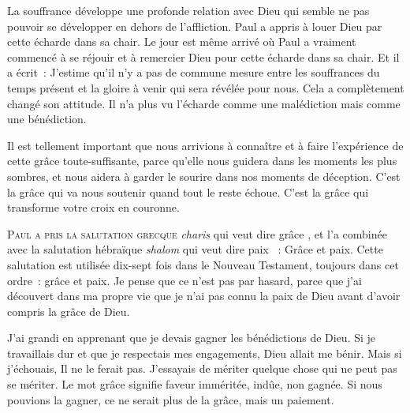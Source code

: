 
La souffrance développe une profonde relation avec Dieu qui semble
 ne pas pouvoir se développer en dehors de l'affliction.
 Paul a appris à louer Dieu par cette écharde dans sa chair.
 Le jour est même arrivé où Paul a vraiment commencé à se réjouir
 et à remercier Dieu pour cette écharde dans sa chair.
 Et il a écrit~: 
 \og J'estime qu'il n'y a pas de commune mesure entre les souffrances
 du temps présent et la gloire à venir qui sera révélée pour nous. \fg{}
 Cela a complètement changé son attitude. Il n'a plus vu l'écharde
 comme une malédiction mais comme une bénédiction.

Il est tellement important que nous arrivions à connaître
 et à faire l'expérience de cette grâce toute-suffisante,
 parce qu'elle nous guidera dans les moments les plus sombres,
 et nous aidera à garder le sourire dans nos moments de déception.
 C'est la grâce qui va nous soutenir quand tout le reste échoue.
 C'est la grâce qui transforme votre croix en couronne.

\dvrule






\lettrine{P}{aul a pris la salutation grecque} \emph{charis}
 qui veut dire \og grâce \fg{}, et l'a combinée avec la salutation
 hébraïque \emph{shalom} qui veut dire \og paix \fg{}~: 
 \og Grâce et paix. \fg{}
 Cette salutation est utilisée dix-sept fois dans le Nouveau Testament,
 toujours dans cet ordre~:  \og grâce et paix. \fg{}
 Je pense que ce n'est pas par hasard, parce que j'ai découvert
 dans ma propre vie que je n'ai pas connu la paix de Dieu
 avant d'avoir compris la grâce de Dieu.

J'ai grandi en apprenant que je devais gagner les bénédictions de Dieu.
 Si je travaillais dur et que je respectais mes engagements,
 Dieu allait me bénir. Mais si j'échouais, Il ne le ferait pas.
 J'essayais de mériter quelque chose qui ne peut pas se mériter.
 Le mot \og grâce \fg{} signifie \og faveur imméritée, indûe,
 non gagnée. \fg{} Si nous pouvions la gagner,
 ce ne serait plus de la grâce, mais un paiement.

